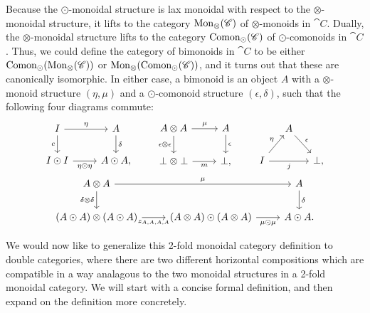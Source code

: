 Because the $\odot$-monoidal structure is lax monoidal with respect to the $\otimes$-monoidal structure, it lifts to the category $\mathrm{Mon}_{\otimes}(\mathscr{C})$ of $\otimes$-monoids in $\cat{C}$. Dually, the $\otimes$-monoidal structure lifts to the category $\mathrm{Comon}_{\odot}(\mathscr{C})$ of $\odot$-comonoids in $\cat{C}$. Thus, we could define the category of bimonoids in $\cat{C}$ to be either $\mathrm{Comon}_{\odot}(\mathrm{Mon}_{\otimes}(\mathscr{C}))$ or $\mathrm{Mon}_{\otimes}(\mathrm{Comon}_{\odot}(\mathscr{C}))$, and it turns out that these are canonically isomorphic. In either case, a bimonoid is an object $A$ with a $\otimes$-monoid structure $(\eta,\mu)$ and a $\odot$-comonoid structure $(\epsilon,\delta)$, such that the following four diagrams commute:
\begin{equation}
\begin{gathered}
\begin{tikzcd}[ampersand replacement=\&]
	I \rar{\eta} \dar[swap]{c} \& A \dar{\delta} \\
	I \odot I \rar[swap]{\eta\odot\eta} \& A\odot A,
\end{tikzcd}
\qquad
\begin{tikzcd}[ampersand replacement=\&]
	A\otimes A \rar{\mu} \dar[swap]{\epsilon\otimes\epsilon} \& A \dar{\epsilon} \\
	\perp\otimes\perp \rar[swap]{m} \& \perp,
\end{tikzcd}
\qquad
\begin{tikzcd}[column sep=small,ampersand replacement=\&]
	{} \& A \drar{\epsilon} \& \\
	I \urar{\eta} \ar{rr}[swap]{j} \&\& \perp,
\end{tikzcd}
\\
\begin{tikzcd}[ampersand replacement=\&]
	A\otimes A \ar{rr}{\mu} \dar[swap]{\delta\otimes\delta} \&\& A \dar{\delta} \\
	(A\odot A)\otimes(A\odot A) \rar[swap]{z_{A,A,A,A}}
		\& (A\otimes A)\odot(A\otimes A) \rar[swap]{\mu\odot\mu}
		\& A\odot A.
\end{tikzcd}
\end{gathered}
\end{equation}

We would now like to generalize this 2-fold monoidal category definition to double categories, where there are two different horizontal compositions which are compatible in a way analagous to the two monoidal structures in a 2-fold monoidal category. We will start with a concise formal definition, and then expand on the definition more concretely.


